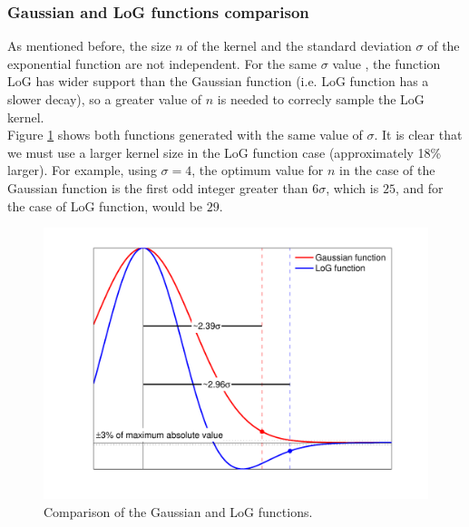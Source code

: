 \documentclass{ipol}
\numberwithin{equation}{section}
\numberwithin{table}{section}
\begin{document}

\subsubsection{Gaussian and LoG functions comparison}
\label{kernelcomparison}

As mentioned before, the size $n$ of the kernel and the standard deviation $\sigma$ of the exponential function 
are not independent. For the same $\sigma$ value , the function LoG has wider support than the
Gaussian function (i.e. LoG function has a slower decay), so a greater value of $n$ is needed to correcly sample the LoG kernel.\\

Figure \ref{fig:kernels} shows both functions generated with the same value of $\sigma$. It is clear that we must use a larger kernel size in the LoG function case (approximately 18\% larger). For 
example, using $\sigma=4$, the optimum value for $n$ in the case of the Gaussian function is the 
first odd integer greater than $6\sigma$, which is $25$, and for the case of LoG function, would 
be $29$.
\myn{\label{math:common:comparison}} 
\begin{figure}[ht]
	\centering
	\includegraphics[width=1.0\textwidth]{kernels.pdf}
	\caption{Comparison of the Gaussian and LoG functions.}
	\label{fig:kernels}
\end{figure}
\end{document}
